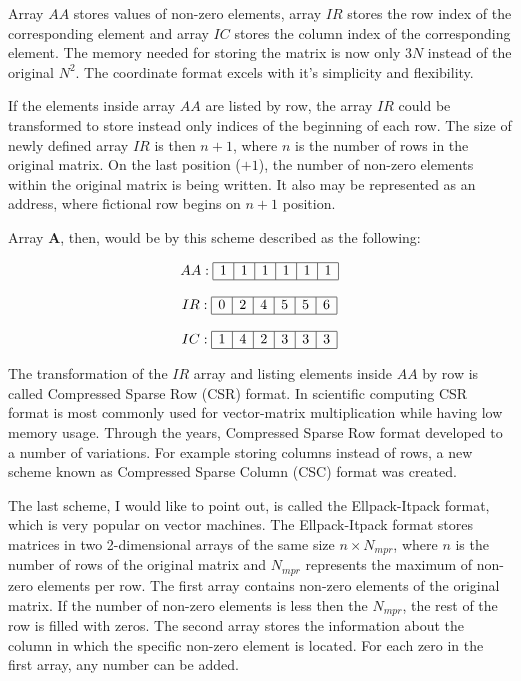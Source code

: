 \documentclass[thesis=M,english]{FITthesis}[2012/10/20]
\begin{document}
Array $AA$ stores values of non-zero elements, array $IR$ stores the row index of the corresponding element and array $IC$ stores the column index of the corresponding element. The memory needed for storing the matrix is now only $3N$ instead of the original $N^2$.  The coordinate format excels with it's simplicity and flexibility.

If the elements inside array $AA$ are listed by row, the array $IR$ could be transformed to store instead only indices of the beginning of each row. The size of newly defined array $IR$ is then $n+1$, where $n$ is the number of rows in the original matrix. On the last position ($+1$), the number of non-zero elements within the original matrix is being written. It also may be represented as an address, where fictional row begins on $n+1$ position. 

Array $\textbf{A}$, then, would be by this scheme described as the following:

$$
\begin{array}{c}
AA:
\begin{array}{|c|c|c|c|c|c|}
 \hline
 1 & 1 & 1 & 1 & 1 & 1 \\
 \hline
\end{array}
\\ \\
IR:
\begin{array}{|c|c|c|c|c|c|}
 \hline
 0 & 2 & 4 & 5 & 5 & 6 \\
 \hline
\end{array}
\\ \\
IC:
\begin{array}{|c|c|c|c|c|c|}
 \hline
 1 & 4 & 2 & 3 & 3 & 3 \\
 \hline
\end{array}
\end{array}
$$



The transformation of the $IR$ array and listing elements inside $AA$ by row is called Compressed Sparse Row (CSR) format. In scientific computing CSR format is most commonly used for vector-matrix multiplication while having low memory usage.
Through the years, Compressed Sparse Row format developed to a number of variations. 
For example storing columns instead of rows, a new scheme known as Compressed Sparse Column (CSC) format was created.

The last scheme, I would like to point out, is called the Ellpack-Itpack format, which is very popular on vector machines. The Ellpack-Itpack format stores matrices in two 2-dimensional arrays of the same size $n \times N_{mpr}$, where $n$ is the number of rows of the original matrix and $N_{mpr}$ represents the maximum of non-zero elements per row. The first array contains non-zero elements of the original matrix. If the number of non-zero elements is less then the $N_{mpr}$, the rest of the row is filled with zeros. The second array stores the information about the column in which the specific non-zero element is located. For each zero in the first array, any number can be added.
\end{document}

